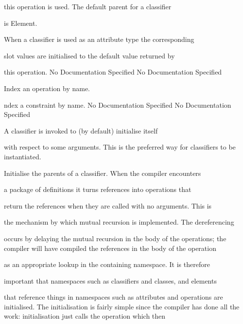       this operation is used. The default parent for a classifier

      is Element.

      When a classifier is used as an attribute type the corresponding

      slot values are initialised to the default value returned by

      this operation.
No Documentation Specified
No Documentation Specified

      Index an operation by name.

       ndex a constraint by name.
No Documentation Specified
No Documentation Specified

      A classifier is invoked to (by default) initialise itself

      with respect to some arguments. This is the preferred way 
      for classifiers to be instantiated.

      Initialise the parents of a classifier. When the compiler encounters

      a package of definitions it turns references into operations that

      return the references when they are called with no arguments. This is

      the mechanism by which mutual recursion is implemented. The dereferencing

      occurs by delaying the mutual recursion in the body of the operations;
      the compiler will have compiled the references in the body of the operation

      as an appropriate lookup in the containing namespace. It is therefore

      important that namespaces such as classifiers and classes, and elements

      that reference things in namespaces such as attributes and operations 
      are initialised. The initialisation is fairly simple since the compiler 
      has done all the work: initialisation just calls the operation which then

